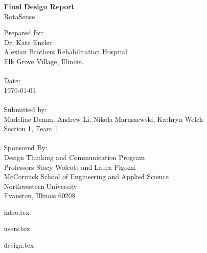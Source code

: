 \documentclass{book}
\begin{document}

\frontmatter

\begin{titlepage}
   \begin{center}
      \huge\textbf{Final Design Report}\\
		\LARGE{RotaSense}\\ \leavevmode
   \end{center}
   
   \large
   \begin{tabbing}
	Prepare\=d for:\\
	\> Dr. Kate Enzler\\
	\> Alexian Brothers Rehabilitation Hospital\\
	\> Elk Grove Village, Illinois.\\
	\\
	Date:\\
	\> \today\\
	\\
	Submitted by:\\
	\> Madeline Demm, Andrew Li, Nikola Maruszewski, Kathryn Welch\\
	\> Section 1, Team 1\\
	\\
	Sponsored By:\\
	\> Design Thinking and Communication Program\\
	\> Professors Stacy Wolcott and Laura Pigozzi\\
	\> McCormick School of Engineering and Applied Science\\
	\> Northwestern University\\
	\> Evanston, Illinois 60208\\
	\end{tabbing}
	\normalsize
\end{titlepage}


\tableofcontents

\mainmatter

{intro.tex}

{users.tex}

{design.tex}
\end{document}

